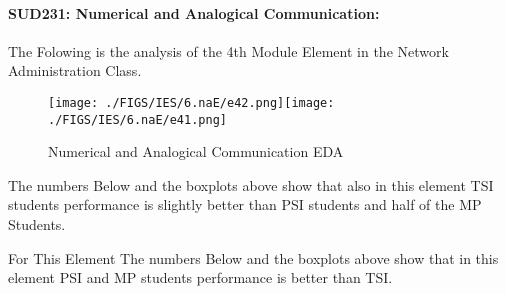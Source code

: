 \documentclass[12pt]{extreport}
\begin{document}

\paragraph{\large SUD231: Numerical and Analogical Communication:\\
} 
The Folowing is the analysis of the 4th Module Element in the Network Administration Class.
\begin{figure}[H]
	\centering
	\texttt{[image: ./FIGS/IES/6.naE/e42.png]}\texttt{[image: ./FIGS/IES/6.naE/e41.png]}
	\caption{Numerical and Analogical Communication EDA}
	\label{fig:75}
\end{figure}

The numbers Below and the boxplots above show that also in this element  TSI students performance is slightly better than PSI students and half of the MP Students.

For This Element The numbers Below and the boxplots above show that in this element  PSI and MP students performance is  better than TSI.
\end{document}
